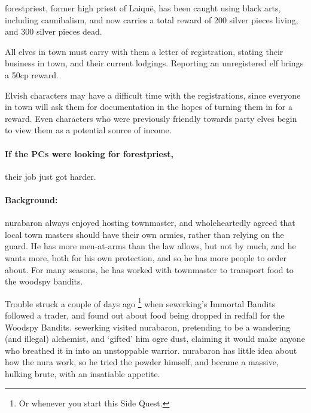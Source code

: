 \begin{multicols}{2}
\begin{speechtext}
  \Gls{forestpriest}, former high priest of Laiqu\"{e}, has been caught using black arts, including cannibalism, and now carries a total reward of 200 silver pieces living, and 300 silver pieces dead.

  All elves in \gls{town} must carry with them a letter of registration, stating their business in town, and their current lodgings.
  Reporting an unregistered elf brings a 50cp reward.

\end{speechtext}

Elvish characters may have a difficult time with the registrations, since everyone in \gls{town} will ask them for documentation in the hopes of turning them in for a reward.
Even characters who were previously friendly towards party elves begin to view them as a potential source of income.

\paragraph{If the PCs were looking for \gls{forestpriest},}
their job just got harder.

\stopcontents[sq]

\resumecontents[Town]

\label{desperatemeasures}

\stopcontents[Town]

\startcontents[sq]

\sqminitoc
\paragraph{Background:}
\gls{nurabaron} always enjoyed hosting \gls{townmaster}, and wholeheartedly agreed that local town masters should have their own armies, rather than relying on the \gls{guard}.
He has more men-at-arms than the law allows, but not by much, and he wants more, both for his own protection, and so he has more people to order about.
For many seasons, he has worked with \gls{townmaster} to transport food to the woodspy bandits.

Trouble struck a couple of days ago%
\footnote{Or whenever you start this Side Quest.}
when \gls{sewerking}'s Immortal Bandits followed a trader, and found out about food being dropped in \gls{redfall} for the Woodspy Bandits.
\Gls{sewerking} visited \gls{nurabaron}, pretending to be a wandering (and illegal) alchemist, and `gifted' him ogre dust, claiming it would make anyone who breathed it in into an unstoppable warrior.
\Gls{nurabaron} has little idea about how the nura work, so he tried the powder himself, and became a massive, hulking brute, with an insatiable appetite.


\end{multicols}
